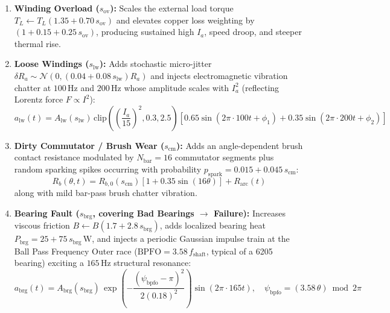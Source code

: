 \documentclass[11pt,a4paper]{article}
\begin{document}
\begin{enumerate}[leftmargin=*, itemsep=4pt]
    \item \textbf{Winding Overload ($s_{\text{ov}}$):} Scales the external load torque $T_L \leftarrow T_L(1.35 + 0.70\,s_{\text{ov}})$ and elevates copper loss weighting by $(1 + 0.15 + 0.25\,s_{\text{ov}})$, producing sustained high $I_a$, speed droop, and steeper thermal rise.
    
    \item \textbf{Loose Windings ($s_{\text{lw}}$):} Adds stochastic micro-jitter $\delta R_a \sim \mathcal{N}(0, (0.04 + 0.08\,s_{\text{lw}})R_a)$ and injects electromagnetic vibration chatter at $100\,\text{Hz}$ and $200\,\text{Hz}$ whose amplitude scales with $I_a^2$ (reflecting Lorentz force $F \propto I^2$):
    \begin{equation}
        a_{\text{lw}}(t) = A_{\text{lw}}(s_{\text{lw}})\,\text{clip}\!\left(\left(\frac{I_a}{15}\right)^2, 0.3, 2.5\right)\left[0.65\sin(2\pi \cdot 100t + \phi_1) + 0.35\sin(2\pi \cdot 200t + \phi_2)\right]
    \end{equation}
    
    \item \textbf{Dirty Commutator / Brush Wear ($s_{\text{cm}}$):} Adds an angle-dependent brush contact resistance modulated by $N_{\text{bar}} = 16$ commutator segments plus random sparking spikes occurring with probability $p_{\text{spark}} = 0.015 + 0.045\,s_{\text{cm}}$:
    \begin{equation}
        R_b(\theta, t) = R_{b,0}(s_{\text{cm}})\left[1 + 0.35\sin(16\theta)\right] + R_{\text{arc}}(t)
    \end{equation}
    along with mild bar-pass brush chatter vibration.
    
    \item \textbf{Bearing Fault ($s_{\text{brg}}$, covering Bad Bearings $\rightarrow$ Failure):} Increases viscous friction $B \leftarrow B(1.7 + 2.8\,s_{\text{brg}})$, adds localized bearing heat $P_{\text{brg}} = 25 + 75\,s_{\text{brg}}\,\text{W}$, and injects a periodic Gaussian impulse train at the Ball Pass Frequency Outer race ($\text{BPFO} = 3.58\,f_{\text{shaft}}$, typical of a 6205 bearing) exciting a $165\,\text{Hz}$ structural resonance:
    \begin{equation}
        a_{\text{brg}}(t) = A_{\text{brg}}(s_{\text{brg}})\,\exp\!\left(-\frac{(\psi_{\text{bpfo}} - \pi)^2}{2(0.18)^2}\right)\sin(2\pi \cdot 165t), \quad \psi_{\text{bpfo}} = (3.58\,\theta) \bmod 2\pi
    \end{equation}
    

\end{enumerate}
\end{document}
